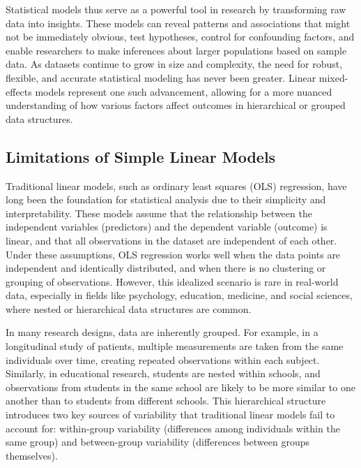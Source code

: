Statistical models thus serve as a powerful tool in research by transforming raw data into insights. These models can reveal patterns and associations that might not be immediately obvious, test hypotheses, control for confounding factors, and enable researchers to make inferences about larger populations based on sample data. As datasets continue to grow in size and complexity, the need for robust, flexible, and accurate statistical modeling has never been greater. Linear mixed-effects models represent one such advancement, allowing for a more nuanced understanding of how various factors affect outcomes in hierarchical or grouped data structures.

\subsection{Limitations of Simple Linear Models}
Traditional linear models, such as ordinary least squares (OLS) regression, have long been the foundation for statistical analysis due to their simplicity and interpretability. These models assume that the relationship between the independent variables (predictors) and the dependent variable (outcome) is linear, and that all observations in the dataset are independent of each other. Under these assumptions, OLS regression works well when the data points are independent and identically distributed, and when there is no clustering or grouping of observations. However, this idealized scenario is rare in real-world data, especially in fields like psychology, education, medicine, and social sciences, where nested or hierarchical data structures are common.

In many research designs, data are inherently grouped. For example, in a longitudinal study of patients, multiple measurements are taken from the same individuals over time, creating repeated observations within each subject. Similarly, in educational research, students are nested within schools, and observations from students in the same school are likely to be more similar to one another than to students from different schools. This hierarchical structure introduces two key sources of variability that traditional linear models fail to account for: within-group variability (differences among individuals within the same group) and between-group variability (differences between groups themselves).

